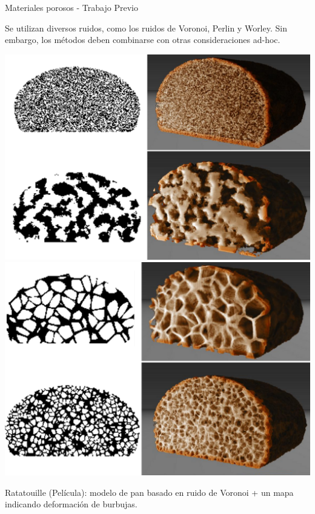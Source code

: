 \documentclass[spanish]{beamer}
\begin{document}
\begin{frame}{Materiales porosos - Trabajo Previo}

Se utilizan diversos ruidos, como los ruidos de Voronoi, Perlin y Worley. Sin embargo, los métodos deben combinarse con otras consideraciones ad-hoc.

\includegraphics[scale = 0.2]{../figures/Fig8}
\includegraphics[scale = 0.2]{../figures/Fig9CAVW}

Ratatouille (Película): modelo de pan basado en ruido de Voronoi + un mapa indicando deformación de burbujas.
\end{frame}
\end{document}
